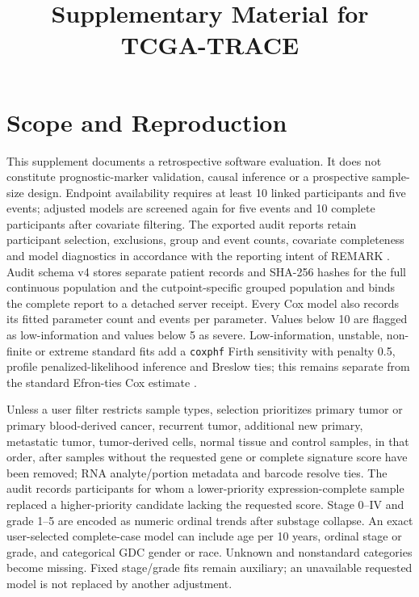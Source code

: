 \documentclass[12pt]{article}
\title{Supplementary Material for TCGA-TRACE}
\author{}
\date{}
\begin{document}
\maketitle

\section*{Scope and Reproduction}

This supplement documents a retrospective software evaluation. It does not
constitute prognostic-marker validation, causal inference or a prospective
sample-size design. Endpoint availability requires at least 10 linked
participants and five events; adjusted models are screened again for five
events and 10 complete participants after covariate filtering. The exported audit reports
retain participant selection, exclusions, group and event counts, covariate
completeness and model diagnostics in accordance with the reporting intent of
REMARK \citep{remark2012}. Audit schema v4 stores separate patient records and
SHA-256 hashes for the full continuous population and the cutpoint-specific
grouped population and binds the complete report to a detached server receipt.
Every Cox model also records its fitted parameter count and events per
parameter. Values below 10 are flagged as low-information and values below 5
as severe. Low-information, unstable, non-finite or extreme standard fits add
a \texttt{coxphf} Firth sensitivity with penalty 0.5, profile
penalized-likelihood inference and Breslow ties; this remains separate from the
standard Efron-ties Cox estimate \citep{heinzeSchemper2001}.

Unless a user filter restricts sample types, selection prioritizes primary
tumor or primary blood-derived cancer, recurrent tumor, additional new primary,
metastatic tumor, tumor-derived cells, normal tissue and control samples, in
that order, after samples without the requested gene or complete signature score
have been removed; RNA analyte/portion metadata and barcode resolve ties. The
audit records participants for whom a lower-priority expression-complete sample
replaced a higher-priority candidate lacking the requested score. Stage 0--IV
and grade 1--5 are encoded as numeric ordinal trends after substage collapse.
An exact user-selected complete-case model can include age per 10 years,
ordinal stage or grade, and categorical GDC gender or race. Unknown and
nonstandard categories become missing. Fixed stage/grade fits remain
auxiliary; an unavailable requested model is not replaced by another
adjustment.
\end{document}
